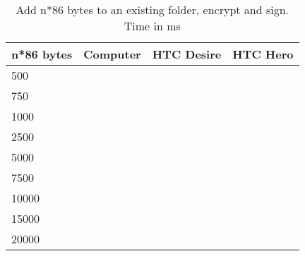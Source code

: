 \begin{table}
  \centering
  \caption{Add n*86 bytes to an existing folder, encrypt and sign. Time in ms}
  \begin{tabular}{ | l | l | l | l |}
    \hline
    \textbf{n*86 bytes} & \textbf{Computer} & \textbf{HTC Desire} & \textbf{HTC Hero} \\ \hline
    500     &   &   & \\ \hline
    750     &   &   & \\ \hline
    1000    &   &   & \\ \hline
    2500    &   &   & \\ \hline     
    5000    &   &   & \\ \hline 
    7500    &   &   & \\ \hline 
    10000   &   &   & \\ \hline 
    15000   &   &   & \\ \hline 
    20000   &   &   & \\ \hline 
  \end{tabular}
  \label{tbl:folder:updateexisting}
\end{table}
